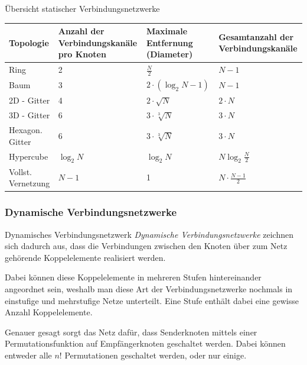 \begin{bonus}{Übersicht statischer Verbindungsnetzwerke}
    \begin{tabularx}{\textwidth}{|l|X|X|X|}
        \toprule
        Topologie          & Anzahl der Verbindungskanäle pro Knoten & Maximale Entfernung (Diameter) & Gesamtanzahl der Verbindungskanäle \\
        \midrule
        Ring               & 2                                       & $\frac{N}{2}$                  & $N-1$                              \\
        \midrule
        Baum               & 3                                       & $2\cdot (\log_2 N - 1)$        & $N-1$                              \\
        \midrule
        2D - Gitter        & 4                                       & $2\cdot \sqrt{N}$              & $2\cdot N$                         \\
        \midrule
        3D - Gitter        & 6                                       & $3\cdot \sqrt[3]{N}$           & $3\cdot N$                         \\
        \midrule
        Hexagon. Gitter    & 6                                       & $3\cdot \sqrt[3]{N}$           & $3\cdot N$                         \\
        \midrule
        Hypercube          & $\log_2 N$                              & $\log_2 N$                     & $N \log_2 \frac{N}{2}$             \\
        \midrule
        Vollst. Vernetzung & $N - 1$                                 & 1                              & $N \cdot \frac{N-1}{2}$            \\
        \bottomrule
    \end{tabularx}
\end{bonus}

\subsubsection{Dynamische Verbindungsnetzwerke}

\begin{defi}{Dynamisches Verbindungsnetzwerk}
    \emph{Dynamische Verbindungsnetzwerke} zeichnen sich dadurch aus, dass die Verbindungen zwischen den Knoten über zum Netz gehörende Koppelelemente realisiert werden.
    
    Dabei können diese Koppelelemente in mehreren Stufen hintereinander angeordnet sein, weshalb man diese Art der Verbindungsnetzwerke nochmals in einstufige und mehrstufige Netze unterteilt.
    Eine Stufe enthält dabei eine gewisse Anzahl Koppelelemente.
    
    Genauer gesagt sorgt das Netz dafür, dass Senderknoten mittels einer Permutationsfunktion auf Empfängerknoten geschaltet werden.
    Dabei können entweder alle $n!$ Permutationen geschaltet werden, oder nur einige.
\end{defi}

